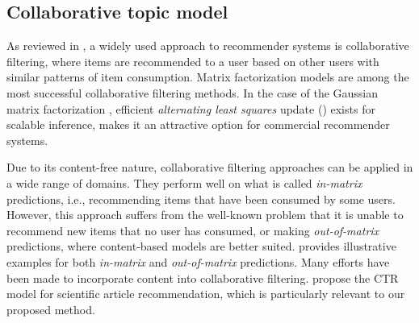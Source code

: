 
\subsection{Collaborative topic model}\label{chpt:content:sec:ctm}

As reviewed in , a widely used approach to recommender systems is collaborative filtering, where items are recommended to a user based on other
users with similar patterns of item consumption. Matrix factorization models \citep{hu2008collaborative, koren2009matrix} are among the most successful collaborative filtering methods. In the case of the Gaussian matrix factorization \citep{salakhutdinov2008probabilistic}, efficient \textit{alternating least squares} update () exists for scalable inference, makes it an attractive option for commercial recommender systems.

Due to its content-free nature, collaborative filtering approaches can be applied in a wide range of domains. They perform well on what is called \emph{in-matrix} predictions, i.e., recommending items that have been consumed by some users. However, this approach suffers from the well-known problem that it is unable to recommend new items that no user has consumed, or making \emph{out-of-matrix} predictions, where content-based models are better suited.  provides illustrative examples for both \emph{in-matrix} and \emph{out-of-matrix} predictions. Many efforts have been made to incorporate content into collaborative filtering. \citet{wang2011collaborative} propose the \gls{CTR} model for scientific article recommendation, which is particularly relevant to our proposed method.  


